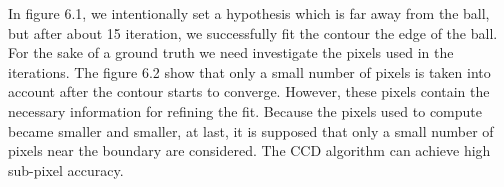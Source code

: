In figure 6.1, we intentionally set a hypothesis which is far away
from the ball, but after about 15 iteration, we successfully fit the
contour the edge of the ball. For the sake of a ground truth we need
investigate the pixels used in the iterations. The figure 6.2 show
that only a small number of pixels is taken into account after the
contour starts to converge. However, these pixels contain the
necessary information for refining the fit. Because the pixels used
to compute became smaller and smaller, at last, it is supposed that
only a small number of pixels near the boundary are considered. The
CCD algorithm can achieve high sub-pixel accuracy.

\begin{figure} 
  \begin{minipage}[t]{0.45\linewidth} 
    \centering 
  \end{minipage}%
  \begin{minipage}[t]{0.45\linewidth} 
    \centering 
  \end{minipage} 
  \begin{minipage}[t]{0.45\linewidth} 
    \centering 

\end{minipage}
\end{figure}
